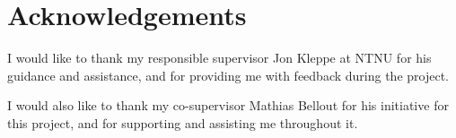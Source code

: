 
\section*{Acknowledgements} %
I would like to thank my responsible supervisor Jon Kleppe at NTNU for his guidance and assistance, and for providing me with feedback during the project.

I would also like to thank my co-supervisor Mathias Bellout for his initiative for this project, and for supporting and assisting me throughout it.
